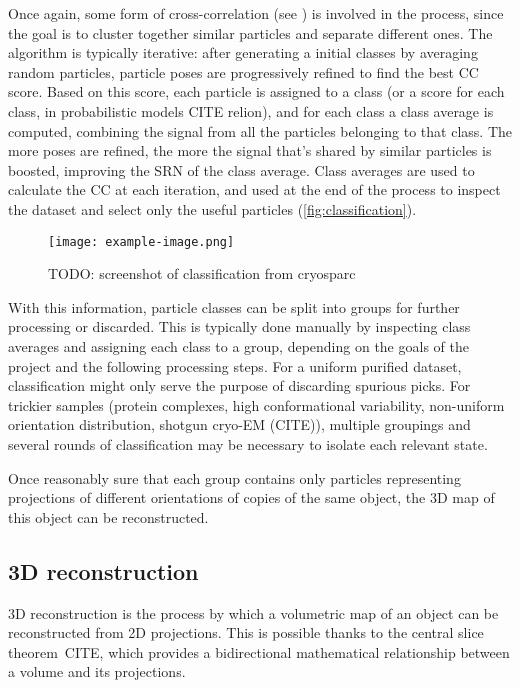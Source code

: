 Once again, some form of cross-correlation (see ) is involved in the process, since the goal is to cluster together similar particles and separate different ones.
The algorithm is typically iterative: after generating a initial classes by averaging random particles, particle poses are progressively refined to find the best CC score.
Based on this score, each particle is assigned to a class (or a score for each class, in probabilistic models CITE relion), and for each class a class average is computed, combining the signal from all the particles belonging to that class. The more poses are refined, the more the signal that's shared by similar particles is boosted, improving the SRN of the class average.
Class averages are used to calculate the CC at each iteration, and used at the end of the process to inspect the dataset and select only the useful particles (\autoref{fig:classification}).

\begin{figure}[ht]
    \centering
    \texttt{[image: example-image.png]}
    \caption{TODO: screenshot of classification from cryosparc}
    \label{fig:classification}
\end{figure}

With this information, particle classes can be split into groups for further processing or discarded.
This is typically done manually by inspecting class averages and assigning each class to a group, depending on the goals of the project and the following processing steps.
For a uniform purified dataset, classification might only serve the purpose of discarding spurious picks.
For trickier samples (protein complexes, high conformational variability, non-uniform orientation distribution, shotgun cryo-EM (CITE)), multiple groupings and several rounds of classification may be necessary to isolate each relevant state.

Once reasonably sure that each group contains only particles representing projections of different orientations of copies of the same object, the 3D map of this object can be reconstructed.

\subsection{3D reconstruction}\label{reconstruction}

3D reconstruction is the process by which a volumetric map of an object can be reconstructed from 2D projections.
This is possible thanks to the central slice theorem~CITE, which provides a bidirectional mathematical relationship between a volume and its projections.

